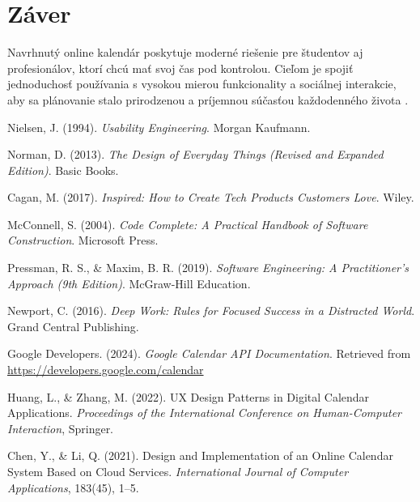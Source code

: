 \documentclass[a4paper,12pt]{article}
\begin{document}
\section{Záver}
Navrhnutý online kalendár poskytuje moderné riešenie pre študentov aj profesionálov, ktorí chcú mať svoj čas pod kontrolou.  
Cieľom je spojiť jednoduchosť používania s vysokou mierou funkcionality a sociálnej interakcie, aby sa plánovanie stalo prirodzenou a príjemnou súčasťou každodenného života \cite{norman_design}.

\newpage
\begin{thebibliography}{9}

Nielsen, J. (1994). \textit{Usability Engineering}. Morgan Kaufmann.

Norman, D. (2013). \textit{The Design of Everyday Things (Revised and Expanded Edition)}. Basic Books.

Cagan, M. (2017). \textit{Inspired: How to Create Tech Products Customers Love}. Wiley.

McConnell, S. (2004). \textit{Code Complete: A Practical Handbook of Software Construction}. Microsoft Press.

Pressman, R. S., \& Maxim, B. R. (2019). \textit{Software Engineering: A Practitioner's Approach (9th Edition)}. McGraw-Hill Education.

Newport, C. (2016). \textit{Deep Work: Rules for Focused Success in a Distracted World}. Grand Central Publishing.

Google Developers. (2024). \textit{Google Calendar API Documentation}. Retrieved from \url{https://developers.google.com/calendar}

Huang, L., \& Zhang, M. (2022). UX Design Patterns in Digital Calendar Applications. \textit{Proceedings of the International Conference on Human-Computer Interaction}, Springer.

Chen, Y., \& Li, Q. (2021). Design and Implementation of an Online Calendar System Based on Cloud Services. \textit{International Journal of Computer Applications}, 183(45), 1–5.

\end{thebibliography}
\end{document}
